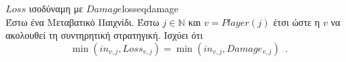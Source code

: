 {}
\begin{lemmagr}{$Loss$ ισοδύναμη με $Damage$}{losseqdamage} \ \\
  Έστω ένα Μεταβατικό Παιχνίδι. Έστω $j \in \mathbb{N}$ και $v = Player\left(j\right)$ έτσι ώστε η $v$ να ακολουθεί τη
  συντηρητική στρατηγική. Ισχύει ότι
  \begin{equation*}
    \min\left(in_{v, j}, Loss_{v, j}\right) = \min\left(in_{v, j}, Damage_{v, j}\right) \enspace.
  \end{equation*}
\end{lemmagr}
